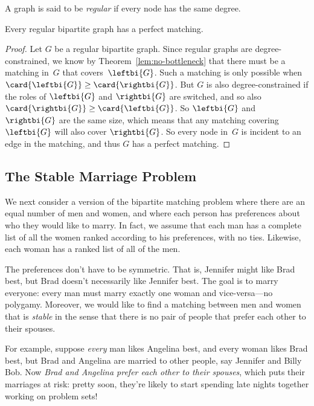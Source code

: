 \begin{definition}\label{def:5P}
A graph is said to be \emph{regular} if every node has the same degree.
\end{definition}

\begin{theorem}\label{thm:5M}
Every regular bipartite graph has a perfect matching.
\end{theorem}

\begin{proof}
  Let $G$ be a regular bipartite graph.  Since regular graphs are
  degree-constrained, we know by Theorem~\ref{lem:no-bottleneck} that
  there must be a matching in~$G$ that covers~$\leftbi{G}$.  Such a
  matching is only possible when $\card{\leftbi{G}} \geq
  \card{\rightbi{G}}$.  But $G$ is also degree-constrained if the roles of
  $\leftbi{G}$ and $\rightbi{G}$ are switched, and so also
  $\card{\rightbi{G}} \geq \card{\leftbi{G}}$.  So $\leftbi{G}$ and
  $\rightbi{G}$ are the same size, which means that any matching covering
  $\leftbi{G}$ will also cover $\rightbi{G}$.  So every node in~$G$ is
  incident to an edge in the matching, and thus $G$ has a perfect
  matching.
\end{proof}

\subsection{The Stable Marriage Problem}
\label{stablemarriagesec}

We next consider a version of the bipartite matching problem where
there are an equal number of men and women, and where each person has
preferences about who they would like to marry.  In fact, we assume
that each man has a complete list of all the women ranked according
to his preferences, with no ties.  Likewise, each woman has a ranked
list of all of the men.

The preferences don't have to be symmetric.  That is, Jennifer might
like Brad best, but Brad doesn't necessarily like Jennifer best.  The
goal is to marry everyone: every man must marry exactly one woman and
vice-versa---no polygamy.  Moreover, we would like to find a matching
between men and women that is \emph{stable} in the sense that there is
no pair of people that prefer each other to their spouses.

For example, suppose \emph{every} man likes Angelina best, and every
woman likes Brad best, but Brad and Angelina are married to other
people, say Jennifer and Billy Bob.  Now \emph{Brad and Angelina
  prefer each other to their spouses}, which puts their marriages at
risk: pretty soon, they're likely to start spending late nights
together working on problem sets!


